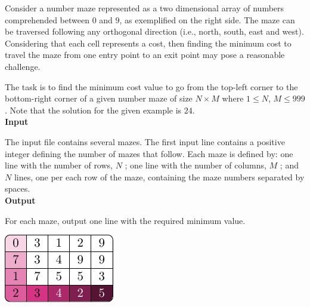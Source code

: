 \documentclass[a4paper,10pt]{article}
\begin{document}
\begin{tcolorbox}[enhanced, frame hidden, borderline west = {1.5pt}{0pt}{gray-700},sidebyside,
    sidebyside align=center,lefthand width=10cm,lower separated=false,fontupper=\sffamily]
    \noindent Consider a number maze represented as a two dimensional array of 
    numbers comprehended between $0$ and $9$, as exemplified on the right side. The 
    maze can be traversed following any orthogonal direction (i.e., north, 
    south, east and west). Considering that each cell represents a cost, then 
    finding the minimum cost to travel the maze from one entry point to 
    an exit point may pose a reasonable challenge.
    
    \noindent The task is to find the minimum cost value to go from the top-left 
    corner to the bottom-right corner of a given number maze of size $N \times M$ 
    where $1 \leq N$, $M \leq 999$. Note that the solution for the given example is $24$. \vspace{1mm} \\
    
    \noindent\textbf{Input}\vspace{1mm}
    
    \noindent The input file contains several mazes. The first input line contains a positive integer defining the number 
    of mazes that follow. Each maze is defined by: one line with the number of rows, $N$ ; one line with 
    the number of columns, $M$ ; and $N$ lines, one per each row of the maze, containing the maze numbers 
    separated by spaces.\vspace{1mm} \\
    
    \noindent\textbf{Output}\vspace{1mm}
    
    \noindent For each maze, output one line with the required minimum value.
    
    \tcblower
        \centering
        \includegraphics[scale=1.2]{maze_exp.pdf}
            \label{fig:mazeexp}
\end{tcolorbox}
\end{document}
